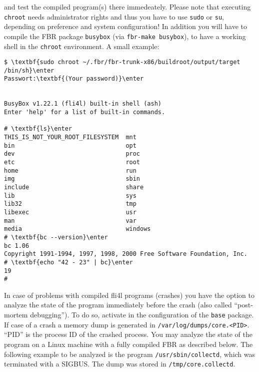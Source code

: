 \noindent and test the compiled program(s) there immedeately. Please note that
executing \texttt{chroot} needs administrator rights and thus you have to use
\texttt{sudo} or \texttt{su}, depending on preference and system configuration!
In addition you will have to compile the FBR package \texttt{busybox}
(via \texttt{fbr-make busybox}), to have a working shell in the \texttt{chroot}
environment. A small example:

\begin{example}
\begin{Verbatim}[commandchars=\\\{\}]
$ \textbf{sudo chroot ~/.fbr/fbr-trunk-x86/buildroot/output/target /bin/sh}\enter
Passwort:\textbf{(Your password)}\enter


BusyBox v1.22.1 (fli4l) built-in shell (ash)
Enter 'help' for a list of built-in commands.

# \textbf{ls}\enter
THIS_IS_NOT_YOUR_ROOT_FILESYSTEM  mnt
bin                               opt
dev                               proc
etc                               root
home                              run
img                               sbin
include                           share
lib                               sys
lib32                             tmp
libexec                           usr
man                               var
media                             windows
# \textbf{bc --version}\enter
bc 1.06
Copyright 1991-1994, 1997, 1998, 2000 Free Software Foundation, Inc.
# \textbf{echo "42 - 23" | bc}\enter
19
#
\end{Verbatim}
\end{example}


In case of problems with compiled fli4l programs (crashes) you have the option
to analyze the state of the program immediately before the crash (also called
``post-mortem debugging''). To do so, activate 
in the configuration of the \texttt{base} package. If case of a crash
a memory dump is generated in \texttt{/var/log/dumps/core.<PID>}. ``PID''
is the process ID of the crashed process. You may analyze the state of the
program on a Linux machine with a fully compiled FBR as described below.
The following example to be analyzed is the program \texttt{/usr/sbin/collectd},
which was terminated with a SIGBUS. The dump was stored in \texttt{/tmp/core.collectd}.

